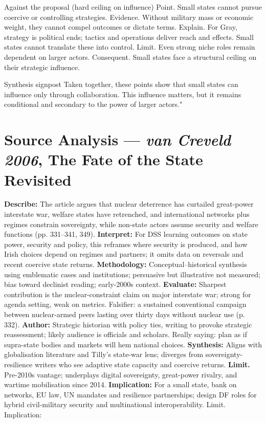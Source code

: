 Against the proposal (hard ceiling on influence)
Point. Small states cannot pursue coercive or controlling strategies.
Evidence. Without military mass or economic weight, they cannot compel outcomes or dictate terms.
Explain. For Gray, strategy is political ends; tactics and operations deliver reach and effects. Small states cannot translate these into control.
Limit. Even strong niche roles remain dependent on larger actors.
Consequent. Small states face a structural ceiling on their strategic influence.

Synthesis signpost
Taken together, these points show that small states can influence only through collaboration. This influence matters, but it remains conditional and secondary to the power of larger actors."



\section*{Source Analysis — \textit{van Creveld 2006}, The Fate of the State Revisited}
\textbf{Describe:} The article argues that nuclear deterrence has curtailed great-power interstate war, welfare states have retrenched, and international networks plus regimes constrain sovereignty, while non-state actors assume security and welfare functions (pp. 331–341, 349).
\textbf{Interpret:} For DSS learning outcomes on state power, security and policy, this reframes where security is produced, and how Irish choices depend on regimes and partners; it omits data on reversals and recent coercive state returns.
\textbf{Methodology:} Conceptual–historical synthesis using emblematic cases and institutions; persuasive but illustrative not measured; bias toward declinist reading; early-2000s context.
\textbf{Evaluate:} Sharpest contribution is the nuclear-constraint claim on major interstate war; strong for agenda setting, weak on metrics. Falsifier: a sustained conventional campaign between nuclear-armed peers lasting over thirty days without nuclear use (p. 332).
\textbf{Author:} Strategic historian with policy ties, writing to provoke strategic reassessment; likely audience is officials and scholars. Really saying: plan as if supra-state bodies and markets will hem national choices.
\textbf{Synthesis:} Aligns with globalisation literature and Tilly’s state-war lens; diverges from sovereignty-resilience writers who see adaptive state capacity and coercive returns.
\textbf{Limit.} Pre-2010s vantage; underplays digital sovereignty, great-power rivalry, and wartime mobilisation since 2014.
\textbf{Implication:} For a small state, bank on networks, EU law, UN mandates and resilience partnerships; design DF roles for hybrid civil-military security and multinational interoperability. Limit. Implication:

